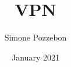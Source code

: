 \documentclass[a4paper, 12pt]{report}
\title{VPN}
\author{Simone Pozzebon}
\date{January 2021}
\begin{document}
\maketitle
\tableofcontents

\section{}
\end{document}
